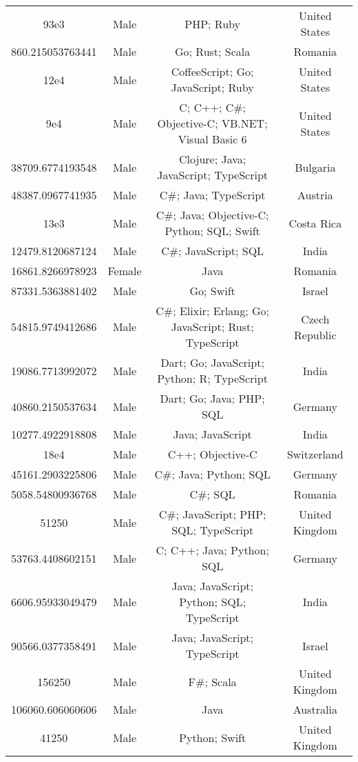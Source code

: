 \begin{center}
\begin{tabular}{ |c|c|c|c| }
93e3  &  Male  &  PHP; Ruby  &  United States  \\ 
860.215053763441  &  Male  &  Go; Rust; Scala  &  Romania  \\ 
12e4  &  Male  &  CoffeeScript; Go; JavaScript; Ruby  &  United States  \\ 
9e4  &  Male  &  C; C++; C\#; Objective-C; VB.NET; Visual Basic 6  &  United States  \\ 
38709.6774193548  &  Male  &  Clojure; Java; JavaScript; TypeScript  &  Bulgaria  \\ 
48387.0967741935  &  Male  &  C\#; Java; TypeScript  &  Austria  \\ 
13e3  &  Male  &  C\#; Java; Objective-C; Python; SQL; Swift  &  Costa Rica  \\ 
12479.8120687124  &  Male  &  C\#; JavaScript; SQL  &  India  \\ 
16861.8266978923  &  Female  &  Java  &  Romania  \\ 
87331.5363881402  &  Male  &  Go; Swift  &  Israel  \\ 
54815.9749412686  &  Male  &  C\#; Elixir; Erlang; Go; JavaScript; Rust; TypeScript  &  Czech Republic  \\ 
19086.7713992072  &  Male  &  Dart; Go; JavaScript; Python; R; TypeScript  &  India  \\ 
40860.2150537634  &  Male  &  Dart; Go; Java; PHP; SQL  &  Germany  \\ 
10277.4922918808  &  Male  &  Java; JavaScript  &  India  \\ 
18e4  &  Male  &  C++; Objective-C  &  Switzerland  \\ 
45161.2903225806  &  Male  &  C\#; Java; Python; SQL  &  Germany  \\ 
5058.54800936768  &  Male  &  C\#; SQL  &  Romania  \\ 
51250  &  Male  &  C\#; JavaScript; PHP; SQL; TypeScript  &  United Kingdom  \\ 
53763.4408602151  &  Male  &  C; C++; Java; Python; SQL  &  Germany  \\ 
6606.95933049479  &  Male  &  Java; JavaScript; Python; SQL; TypeScript  &  India  \\ 
90566.0377358491  &  Male  &  Java; JavaScript; TypeScript  &  Israel  \\ 
156250  &  Male  &  F\#; Scala  &  United Kingdom  \\ 
106060.606060606  &  Male  &  Java  &  Australia  \\ 
41250  &  Male  &  Python; Swift  &  United Kingdom  \\ 

\end{tabular}
\end{center}
